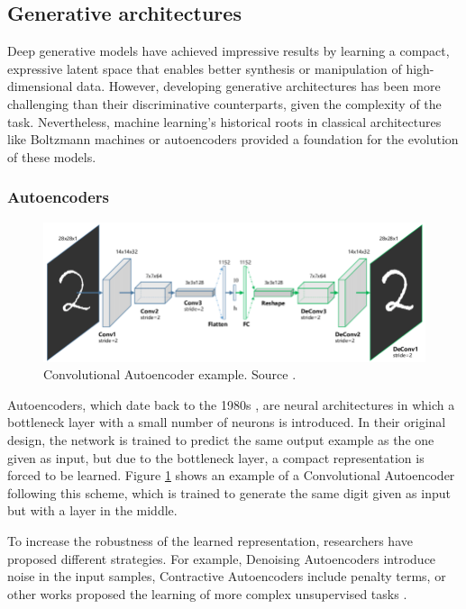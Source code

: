 \subsection{Generative architectures}

Deep generative models have achieved impressive results by learning a compact, expressive latent space that enables better synthesis or manipulation of high-dimensional data. However, developing generative architectures has been more challenging than their discriminative counterparts, given the complexity of the task. Nevertheless, machine learning's historical roots in classical architectures like Boltzmann machines \cite{ackley:boltzmann} or autoencoders \cite{rumelhart:errorpropnonote, ballard:modular} provided a foundation for the evolution of these models.

\subsubsection{Autoencoders}

\begin{figure}
    \centering
    \includegraphics[width=0.8\columnwidth]{img/2-related-work/convolutional-autoencoder.png}
    \caption[Convolutional Autoencoder example]{Convolutional Autoencoder example. Source \cite{neurips/convolutionalautoencoders}.}
    \label{fig:Autoencoder}
\end{figure}


Autoencoders, which date back to the 1980s \cite{rumelhart:errorpropnonote, ballard:modular}, are neural architectures in which a bottleneck layer with a small number of neurons is introduced. In their original design, the network is trained to predict the same output example as the one given as input, but due to the bottleneck layer, a compact representation is forced to be learned. Figure \ref{fig:Autoencoder} shows an example of a Convolutional Autoencoder \cite{neurips/convolutionalautoencoders} following this scheme, which is trained to generate the same digit given as input but with a layer in the middle.

To increase the robustness of the learned representation, researchers have proposed different strategies. For example, Denoising Autoencoders \cite{conf/icml/VincentLBM08} introduce noise in the input samples, Contractive Autoencoders \cite{conf/icml/RifaiVMGB11} include penalty terms, or other works proposed the learning of more complex unsupervised tasks \cite{IEEE/Pathak2016, ieee/zhang2017, Shu_2018_ECCV}.

